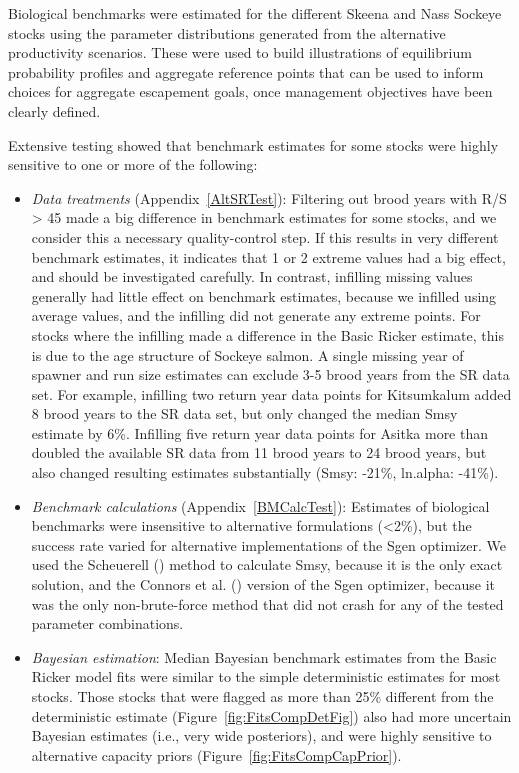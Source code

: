 \documentclass[french,11pt]{book}
\begin{document}
Biological benchmarks were estimated for the different Skeena and Nass Sockeye stocks using the parameter distributions generated from the alternative productivity scenarios. These were used to build illustrations of equilibrium probability profiles and aggregate reference points that can be used to inform choices for aggregate escapement goals, once management objectives have been clearly defined.

Extensive testing showed that benchmark estimates for some stocks were highly sensitive to one or more of the following:
\begin{itemize}

\item
  \emph{Data treatments} (Appendix~\ref{AltSRTest}): Filtering out brood years with R/S \textgreater{} 45 made a big difference in benchmark estimates for some stocks, and we consider this a necessary quality-control step. If this results in very different benchmark estimates, it indicates that 1 or 2 extreme values had a big effect, and should be investigated carefully. In contrast, infilling missing values generally had little effect on benchmark estimates, because we infilled using average values, and the infilling did not generate any extreme points. For stocks where the infilling made a difference in the Basic Ricker estimate, this is due to the age structure of Sockeye salmon. A single missing year of spawner and run size estimates can exclude 3-5 brood years from the SR data set. For example, infilling two return year data points for Kitsumkalum added 8 brood years to the SR data set, but only changed the median Smsy estimate by 6\%. Infilling five return year data points for Asitka more than doubled the available SR data from 11 brood years to 24 brood years, but also changed resulting estimates substantially (Smsy: -21\%, ln.alpha: -41\%).
\item
  \emph{Benchmark calculations} (Appendix~\ref{BMCalcTest}): Estimates of biological benchmarks were insensitive to alternative formulations (\textless2\%), but the success rate varied for alternative implementations of the Sgen optimizer. We used the Scheuerell () method to calculate Smsy, because it is the only exact solution, and the Connors et al. () version of the Sgen optimizer, because it was the only non-brute-force method that did not crash for any of the tested parameter combinations.
\item
  \emph{Bayesian estimation}: Median Bayesian benchmark estimates from the Basic Ricker model fits were similar to the simple deterministic estimates for most stocks. Those stocks that were flagged as more than 25\% different from the deterministic estimate (Figure~\ref{fig:FitsCompDetFig}) also had more uncertain Bayesian estimates (i.e., very wide posteriors), and were highly sensitive to alternative capacity priors (Figure~\ref{fig:FitsCompCapPrior}).
\end{itemize}
\end{document}
